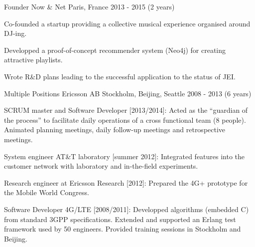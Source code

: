 

\begin{cventries}

  \cventry
    {Founder} %
    {Now \& Net} %
    {Paris, France} %
    {2013 - 2015 (2 years)} %
    {
      \begin{cvitems} %
        \item {Co-founded a startup providing a collective musical experience organised around DJ-ing.}
        \item {Developped a proof-of-concept recommender system (Neo4j) for creating attractive playlists.}
        \item {Wrote R\&D plans leading to the successful application to the status of JEI.}
      \end{cvitems}
    }

  \cventry
    {Multiple Positions} %
    {Ericsson AB} %
    {Stockholm, Beijing, Seattle} %
    {2008 - 2013 (6 years)} %
    {
      \begin{cvitems} %
        \item {SCRUM master and Software Developer [2013/2014]: Acted as the ``guardian of the process'' to facilitate daily operations of a cross functional team (8 people). Animated planning meetings, daily follow-up meetings and retrospective meetings.}
        \item {System engineer AT\&T laboratory [summer 2012]: Integrated features into the customer network with laboratory and in-the-field experiments.}
        \item {Research engineer at Ericsson Research [2012]: Prepared the 4G+ prototype for the Mobile World Congress.}
        \item {Software Developer 4G/LTE [2008/2011]: Developped algorithms (embedded C) from standard 3GPP specifications. Extended and supported an Erlang test framework used by 50 engineers. Provided training sessions in Stockholm and Beijing.}
      \end{cvitems}
    }

\end{cventries}
